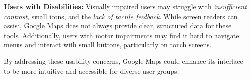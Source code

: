 \textbf{Users with Disabilities:} Visually impaired users may struggle with \textit{insufficient contrast}, small icons, and the \textit{lack of tactile feedback}. While screen readers can assist, Google Maps does not always provide clear, structured data for these tools. Additionally, users with motor impairments may find it hard to navigate menus and interact with small buttons, particularly on touch screens. \autocite{froehlich2019grand}

\blankLine

By addressing these usability concerns, Google Maps could enhance its interface to be more intuitive and accessible for diverse user groups.